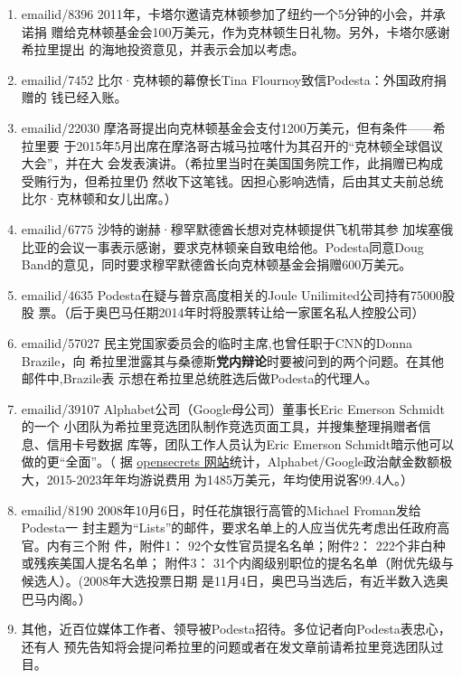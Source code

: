 \begin{enumerate}
\item emailid/8396 2011年，卡塔尔邀请克林顿参加了纽约一个5分钟的小会，并承诺捐
  赠给克林顿基金会100万美元，作为克林顿生日礼物。另外，卡塔尔感谢希拉里提出
  的海地投资意见，并表示会加以考虑。

\item emailid/7452 比尔·克林顿的幕僚长Tina Flournoy致信Podesta：外国政府捐赠的
  钱已经入账。

\item emailid/22030 摩洛哥提出向克林顿基金会支付1200万美元，但有条件——希拉里要
  于2015年5月出席在摩洛哥古城马拉喀什为其召开的“克林顿全球倡议大会”，并在大
  会发表演讲。（希拉里当时在美国国务院工作，此捐赠已构成受贿行为，但希拉里仍
  然收下这笔钱。因担心影响选情，后由其丈夫前总统比尔·克林顿和女儿出席。）

\item emailid/6775 沙特的谢赫·穆罕默德酋长想对克林顿提供飞机带其参
  加埃塞俄比亚的会议一事表示感谢，要求克林顿亲自致电给他。Podesta同意Doug
  Band的意见，同时要求穆罕默德酋长向克林顿基金会捐赠600万美元。

\item emailid/4635 Podesta在疑与普京高度相关的Joule Unilimited公司持有75000股股
  票。（后于奥巴马任期2014年时将股票转让给一家匿名私人控股公司）

\item emailid/57027 民主党国家委员会的临时主席,也曾任职于CNN的Donna Brazile，向
  希拉里泄露其与桑德斯\textbf{党内辩论}时要被问到的两个问题。在其他邮件中,Brazile表
  示想在希拉里总统胜选后做Podesta的代理人。

\item emailid/39107 Alphabet公司（Google母公司）董事长Eric Emerson Schmidt的一个
  小团队为希拉里竞选团队制作竞选页面工具，并搜集整理捐赠者信息、信用卡号数据
  库等，团队工作人员认为Eric Emerson Schmidt暗示他可以做的更“全面”。（
  据
  \href{https://www.opensecrets.org/federal-lobbying/clients/summary?cycle=2019&id=D000067823}{opensecrets
    网站}统计，Alphabet/Google政治献金数额极大，2015-2023年年均游说费用
  为1485万美元，年均使用说客99.4人。）

\item emailid/8190 2008年10月6日，时任花旗银行高管的Michael Froman发给Podesta一
  封主题为“Lists”的邮件，要求名单上的人应当优先考虑出任政府高官。内有三个附
  件，附件1： 92个女性官员提名名单；附件2： 222个非白种或残疾美国人提名名单；
  附件3： 31个内阁级别职位的提名名单（附优先级与候选人）。(2008年大选投票日期
  是11月4日，奥巴马当选后，有近半数入选奥巴马内阁。）

\item 其他，近百位媒体工作者、领导被Podesta招待。多位记者向Podesta表忠心，还有人
  预先告知将会提问希拉里的问题或者在发文章前请希拉里竞选团队过目。
\end{enumerate}


